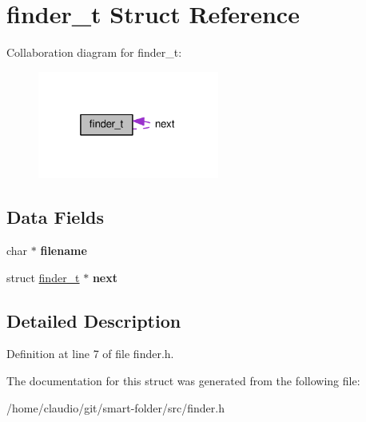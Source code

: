 \hypertarget{structfinder__t}{}\section{finder\+\_\+t Struct Reference}
\label{structfinder__t}


Collaboration diagram for finder\+\_\+t\+:\nopagebreak
\begin{figure}[H]
\begin{center}
\leavevmode
\includegraphics[width=169pt]{structfinder__t__coll__graph}
\end{center}
\end{figure}
\subsection*{Data Fields}
\begin{DoxyCompactItemize}
\item 
char $\ast$ {\bfseries filename}\hypertarget{structfinder__t_aeac90097f29f7529968697163cea5c18}{}\label{structfinder__t_aeac90097f29f7529968697163cea5c18}

\item 
struct \hyperlink{structfinder__t}{finder\+\_\+t} $\ast$ {\bfseries next}\hypertarget{structfinder__t_a7db9cac9324009990f14b7f84bf47d3c}{}\label{structfinder__t_a7db9cac9324009990f14b7f84bf47d3c}

\end{DoxyCompactItemize}


\subsection{Detailed Description}


Definition at line 7 of file finder.\+h.



The documentation for this struct was generated from the following file\+:\begin{DoxyCompactItemize}
\item 
/home/claudio/git/smart-\/folder/src/finder.\+h\end{DoxyCompactItemize}
